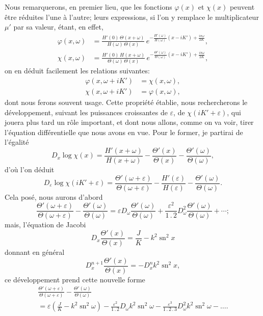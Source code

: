 \documentclass[11pt,leqno,oneside,letterpaper]{book}[2005/09/16]
\DeclareMathOperator{\sn}{sn}
\newcommand{\cntrdot}{\mathbin{.}}
\begin{document}
Nous remarquerons, en premier lieu, que les fonctions $\varphi(x)$ et $\chi(x)$
peuvent \^etre r\'eduites l'une \`a l'autre; leurs expressions, si l'on y remplace
le multiplicateur $\mu'$ par sa valeur, \'etant, en effet,
\begin{align*}
  \varphi(x,\omega) &=
  \frac{ H'(0)\,\Theta(x+\omega) }{ H(\omega)\,\Theta(x) }\,
  e^{- \frac{ H'(\omega) }{ H(\omega) }(x-iK')
     + \frac{ i\pi\omega }{ 2K }} ,
\\
  \chi(x,\omega) &=
  \frac{ H'(0)\,H(x+\omega) }{ \Theta(\omega)\,\Theta(x) }\,
  e^{- \frac{\Theta'(\omega) }{ \Theta(\omega) }(x-iK')
     + \frac{ i\pi\omega }{ 2K }} ,
\end{align*}
on en d\'eduit facilement les relations suivantes:
\begin{align*}
  \varphi(x,\omega+iK') &= \chi(x,\omega), \\
  \chi(x,\omega+iK') &= \varphi(x,\omega),
\end{align*}
dont nous ferons souvent usage. Cette propri\'et\'e \'etablie, nous rechercherons
le d\'eveloppement, suivant les puissances croissantes de $\varepsilon$, de $\chi(iK'+\varepsilon)$,
qui jouera plus tard un r\^ole important, et dont nous allons, comme on va
voir, tirer l'\'equation diff\'erentielle que nous avons en vue. Pour le former,
je partirai de l'\'egalit\'e
\[
  D_x \log\chi(x)
= \frac{ H'(x+\omega) }{ H(x+\omega) }
- \frac{ \Theta'(x) }{ \Theta(x) }
- \frac{ \Theta'(\omega) }{ \Theta(\omega) },
\]
d'o\`u l'on d\'eduit
\[
 D_{\varepsilon} \log\chi(iK' + \varepsilon)
= \frac{ \Theta'(\omega+\varepsilon) }{ \Theta(\omega+\varepsilon) }
- \frac{ H'(\varepsilon) }{ H(\varepsilon) }
- \frac{ \Theta'(\omega) }{ \Theta(\omega) }.
\]
Cela pos\'e, nous aurons d'abord
\[
  \frac{ \Theta'(\omega+\varepsilon) }{ \Theta(\omega+\varepsilon) }
- \frac{ \Theta'(\omega) }{ \Theta(\omega) }
= \varepsilon D_{\omega}
  \frac{ \Theta'(\omega) }{ \Theta(\omega) }
+ \frac{ \varepsilon^2 }{ 1\cntrdot 2 } D_{\omega}^2
  \frac{ \Theta'(\omega) }{ \Theta(\omega) } + \cdots ;
\]
mais, l'\'equation de Jacobi
\[
  D_x \frac{ \Theta'(x) }{ \Theta(x) }
= \frac{J}{K} - k^2 \sn^2 x
\]
donnant en g\'en\'eral
\[
   D_x^{n+1} \frac{ \Theta'(x) }{ \Theta(x) }
=- D_x^n k^2 \sn^2 x,
\]
ce d\'eveloppement prend cette nouvelle forme
\begin{multline*}
  \frac{\Theta'(\omega+\varepsilon)}{\Theta(\omega+\varepsilon)}
- \frac{\Theta'(\omega)}{\Theta(\omega)} \\
= \varepsilon \left( \frac{J}{K} - k^2\sn^2\omega \right)
- \frac{\varepsilon^2}{1\cntrdot 2}
  D_{\omega} k^2 \sn^2\omega
- \frac{\varepsilon^3}{1\cntrdot 2\cntrdot 3}
  D_{\omega}^2 k^2 \sn^2\omega - \ldots.
\end{multline*}
\end{document}
